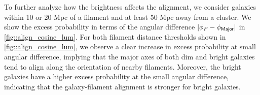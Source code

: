 \documentclass[usenatbib,useAMS]{mnras}
\theoremstyle{remark}
\begin{document}
{{To further analyze how the brightness affects the alignment, 
we consider galaxies within 10 or 20 Mpc of a filament %
and at least 50 Mpc away from a cluster.
We show the excess probability in terms of the angular difference 
$|\phi_F-\phi_{\sf Major}|$ in \autoref{fig::align_cosine_lum}.
For both filament distance thresholds shown in \autoref{fig::align_cosine_lum}, we observe a clear increase in excess probability at small angular difference, implying that the major axes of both dim and bright galaxies tend to align along the orientation of nearby filaments. 
Moreover, the bright galaxies have a higher excess probability
at the small angular difference, indicating that 
the galaxy-filament alignment is stronger for bright galaxies.
%

}}
\end{document}
